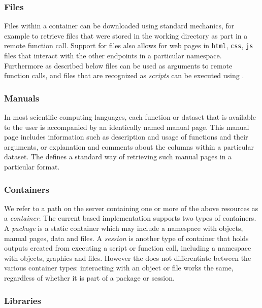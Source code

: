\subsubsection{Files}

Files within a container can be downloaded using standard \HTTP mechanics, for example to retrieve files that were stored in the working directory as part in a remote function call. Support for files also allows for web pages in \texttt{html}, \texttt{css}, \texttt{js} files that interact with the other \API endpoints in a particular namespace. Furthermore as described below files can be used as arguments to remote function calls, and files that are recognized as \emph{scripts} can be executed using \RPC.

\subsubsection{Manuals}

In most scientific computing languages, each function or dataset that is available to the user is accompanied by an identically named manual page. This manual page includes information such as description and usage of functions and their arguments, or explanation and comments about the columns within a particular dataset. The \API defines a standard way of retrieving such manual pages in a particular format.

\subsubsection{Containers}
 
We refer to a path on the server containing one or more of the above resources as a \emph{container}. The current \R based \OpenCPU implementation supports two types of containers. A \emph{package} is a static container which may include a namespace with objects, manual pages, data and files. A \emph{session} is another type of container that holds outputs created from executing a script or function call, including a namespace with objects, graphics and files. However the \API does not differentiate between the various container types: interacting with an object or file works the same, regardless of whether it is part of a package or session.

\subsubsection{Libraries}

